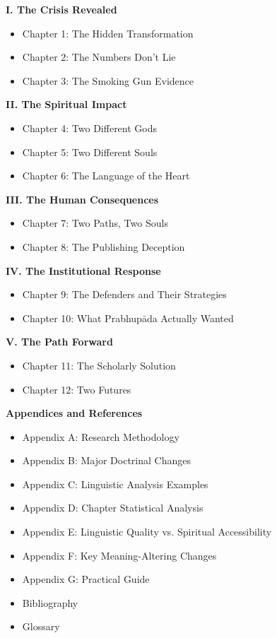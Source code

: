 \documentclass[11pt,twoside]{book}
\begin{document}
\setlength{\parskip}{1pt}
\textbf{I.  The Crisis Revealed}
\begin{itemize}
\item Chapter 1: The Hidden Transformation
\item Chapter 2: The Numbers Don't Lie
\item Chapter 3: The Smoking Gun Evidence
\end{itemize}
\vspace{0.4cm}
\textbf{II.  The Spiritual Impact}
\begin{itemize}
\item Chapter 4: Two Different Gods
\item Chapter 5: Two Different Souls
\item Chapter 6: The Language of the Heart
\end{itemize}
\vspace{0.4cm}
\textbf{III.  The Human Consequences}
\begin{itemize}
\item Chapter 7: Two Paths, Two Souls
\item Chapter 8: The Publishing Deception
\end{itemize}
\vspace{0.4cm}
\textbf{IV.  The Institutional Response}
\begin{itemize}
\item Chapter 9: The Defenders and Their Strategies
\item Chapter 10: What Prabhupāda Actually Wanted
\end{itemize}
\vspace{0.4cm}
\textbf{V.  The Path Forward}
\begin{itemize}
\item Chapter 11: The Scholarly Solution
\item Chapter 12: Two Futures
\end{itemize}
\setlength{\parskip}{4pt plus 1pt minus 1pt}

\newpage
\thispagestyle{empty}

\textbf{Appendices and References}
\begin{itemize}
\item Appendix A: Research Methodology
\item Appendix B: Major Doctrinal Changes
\item Appendix C: Linguistic Analysis Examples
\item Appendix D: Chapter Statistical Analysis
\item Appendix E: Linguistic Quality vs. Spiritual Accessibility
\item Appendix F: Key Meaning-Altering Changes
\item Appendix G: Practical Guide
\item Bibliography
\item Glossary
\end{itemize}
\end{document}
